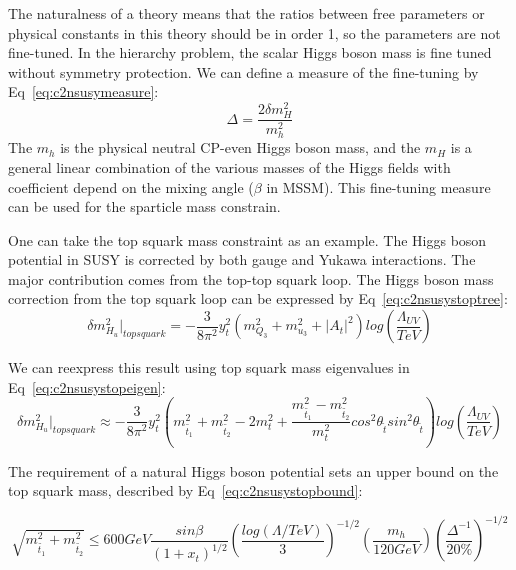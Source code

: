 The naturalness of a theory means that the ratios between free parameters or physical constants in this theory should be in order 1, so the parameters are not fine-tuned. In the hierarchy problem, the scalar Higgs boson mass is fine tuned without symmetry protection. We can define a measure of the fine-tuning by Eq~\ref{eq:c2nsusymeasure}:
\begin{equation}
 \Delta = \frac{2\delta m_{H}^{2}}{m_{h}^{2}}
 \label{eq:c2nsusymeasure}
\end{equation}
The $m_{h}$ is the physical neutral CP-even Higgs boson mass, and the $m_{H}$ is a general linear combination of the various masses of the Higgs fields with coefficient depend on the mixing angle ($\beta$ in MSSM). This fine-tuning measure can be used for the sparticle mass constrain. 

One can take the top squark mass constraint as an example. The Higgs boson potential in SUSY is corrected by both gauge and Yukawa interactions. The major contribution comes from the top-top squark loop. The Higgs boson mass correction from the top squark loop can be expressed by Eq~\ref{eq:c2nsusystoptree}: 
\begin{equation}
 \delta m_{H_{u}}^{2}|_{top squark} = - \frac{3}{8\pi^{2}}y_{t}^{2}(m_{Q_{3}}^{2}+m_{u_{3}}^{2}+|A_{t}|^{2})log(\frac{\Lambda_{UV}}{TeV})
 \label{eq:c2nsusystoptree}
\end{equation}

We can reexpress this result using top squark mass eigenvalues in Eq~\ref{eq:c2nsusystopeigen}:
\begin{equation}
	\delta m_{H_{u}}^{2}|_{top squark} \approx - \frac{3}{8\pi^{2}}y_{t}^{2}(m_{\tilde{t_{1}}}^{2}+m_{\tilde{t_{2}}}^{2}-2m_{t}^{2}+\frac{m_{\tilde{t_{1}}}^{2}-m_{\tilde{t_{2}}}^{2}}{m_{t}^{2}}cos^{2}\theta_{\tilde{t}}sin^{2}\theta_{\tilde{t}})log(\frac{\Lambda_{UV}}{TeV})
 \label{eq:c2nsusystopeigen}
\end{equation}

The requirement of a natural Higgs boson potential sets an upper bound on the top squark mass\cite{Papucci:2011wy}, described by Eq~\ref{eq:c2nsusystopbound}:

\begin{equation}
 \sqrt{m_{\tilde{t_{1}}}^{2}+m_{\tilde{t_{2}}}^{2}} \leq 600GeV\frac{sin\beta}{(1+x_{t})^{1/2}} (\frac{log(\Lambda/TeV)}{3})^{-1/2}(\frac{m_{h}}{120GeV})(\frac{\Delta^{-1}}{20\%})^{-1/2}
 \label{eq:c2nsusystopbound}
\end{equation}

